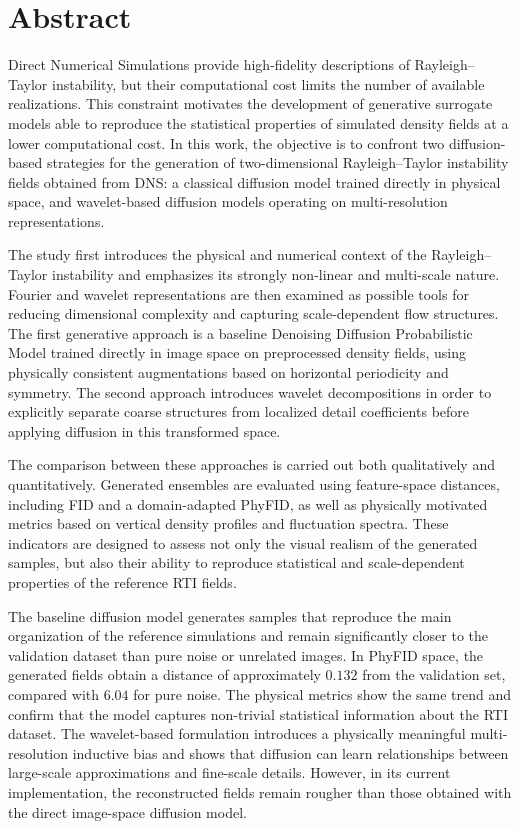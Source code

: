 \chapter*{Abstract}

Direct Numerical Simulations provide high-fidelity descriptions of
Rayleigh--Taylor instability, but their computational cost limits the number of
available realizations. This constraint motivates the development of generative
surrogate models able to reproduce the statistical properties of simulated
density fields at a lower computational cost. In this work, the objective is to
confront two diffusion-based strategies for the generation of two-dimensional
Rayleigh--Taylor instability fields obtained from DNS: a classical diffusion
model trained directly in physical space, and wavelet-based diffusion models
operating on multi-resolution representations.

The study first introduces the physical and numerical context of the
Rayleigh--Taylor instability and emphasizes its strongly non-linear and
multi-scale nature. Fourier and wavelet representations are then examined as
possible tools for reducing dimensional complexity and capturing scale-dependent
flow structures. The first generative approach is a baseline Denoising
Diffusion Probabilistic Model trained directly in image space on preprocessed
density fields, using physically consistent augmentations based on horizontal
periodicity and symmetry. The second approach introduces wavelet decompositions
in order to explicitly separate coarse structures from localized detail
coefficients before applying diffusion in this transformed space.

The comparison between these approaches is carried out both qualitatively and
quantitatively. Generated ensembles are evaluated using feature-space
distances, including FID and a domain-adapted PhyFID, as well as physically
motivated metrics based on vertical density profiles and fluctuation spectra.
These indicators are designed to assess not only the visual realism of the
generated samples, but also their ability to reproduce statistical and
scale-dependent properties of the reference RTI fields.

The baseline diffusion model generates samples that reproduce the main
organization of the reference simulations and remain significantly closer to
the validation dataset than pure noise or unrelated images. In PhyFID space,
the generated fields obtain a distance of approximately $0.132$ from the
validation set, compared with $6.04$ for pure noise. The physical metrics show
the same trend and confirm that the model captures non-trivial statistical
information about the RTI dataset. The wavelet-based formulation introduces a
physically meaningful multi-resolution inductive bias and shows that diffusion
can learn relationships between large-scale approximations and fine-scale
details. However, in its current implementation, the reconstructed fields remain
rougher than those obtained with the direct image-space diffusion model.

